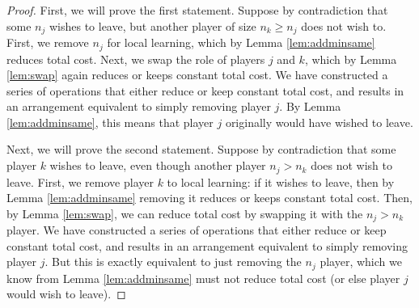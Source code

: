 \documentclass{article}
\newcommand{\ndraw}[0]{\ensuremath{n}}
\begin{document}
\begin{proof}
First, we will prove the first statement. Suppose by contradiction that some $\ndraw_j$ wishes to leave, but another player of size $\ndraw_k \geq \ndraw_j$ does not wish to. First, we remove $\ndraw_j$ for local learning, which by Lemma \ref{lem:addminsame} reduces total cost. Next, we swap the role of players $j$ and $k$, which by Lemma \ref{lem:swap} again reduces or keeps constant total cost. We have constructed a series of operations that either reduce or keep constant total cost, and results in an arrangement equivalent to simply removing player $j$. By Lemma \ref{lem:addminsame}, this means that player $j$ originally would have wished to leave.

Next, we will prove the second statement. Suppose by contradiction that some player $k$ wishes to leave, even though another player $\ndraw_j > \ndraw_k$ does not wish to leave. First, we remove player $k$ to local learning: if it wishes to leave, then by Lemma \ref{lem:addminsame} removing it reduces or keeps constant total cost. Then, by Lemma \ref{lem:swap}, we can reduce total cost by swapping it with the $\ndraw_j>\ndraw_k$ player. We have constructed a series of operations that either reduce or keep constant total cost, and results in an arrangement equivalent to simply removing player $j$. But this is exactly equivalent to just removing the $\ndraw_j$ player, which we know from Lemma \ref{lem:addminsame} must not reduce total cost (or else player $j$ would wish to leave).
\end{proof}

\merge*
\end{document}
